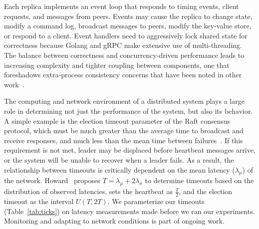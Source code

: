 Each replica implements an event loop that responds to timing events,
client requests, and messages from peers.
Events may cause the replica to change state, modify a command log, broadcast
messages to peers, modify the key-value store, or respond to a client.
Event
handlers need to aggressively lock shared state for correctness because Golang and
gRPC make extensive use of multi-threading.
The balance between correctness and concurrency-driven performance leads to
increasing complexity and tighter coupling between components, one that
foreshadows extra-process consistency concerns that have been noted in other
work~\cite{paxos_live,raft,raft_students_guide}.

The computing and network environment of a distributed system
plays a large role in determining not just the performance of the system, but
also its behavior.
A simple example is the election timeout parameter of the Raft consensus
protocol, which must be much greater than the average time to
broadcast and receive responses, and much less than the mean time
between failures~\cite{raft,etcd_raft,oliveira_evaluating_2016}.
If this requirement is not met,
leader may be displaced before heartbeat messages arrive, or the system will be
unable to recover when a leader fails.
As a result, the relationship between timeouts is critically dependent on the mean
latency ($\lambda_{\mu}$) of the network.
Howard~\cite{raft_refloated} proposes  $T = \lambda_{\mu} +
2\lambda_{\sigma}$ to determine timeouts based on the distribution of observed
latencies, sets the heartbeat as $\frac {T} {2}$, and the election timeout as
the interval $U(T,2T)$.
We parameterize our timeouts (Table~\ref{tab:ticks}) on
latency measurements made before we ran our experiments.
Monitoring and adapting to network conditions is part of ongoing work.


